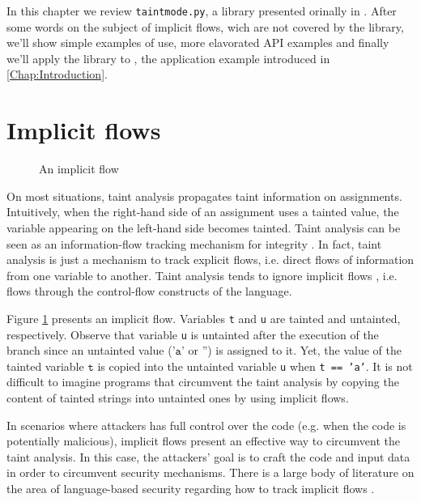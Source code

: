 In this chapter we review \texttt{taintmode.py}, a library
presented orinally in \cite{PythonLib}. After some words on the 
subject of implicit flows, wich are not covered by the library,
we'll show simple examples of use, more elavorated API examples
and finally we'll apply the library to \suggestions, the application
example introduced in \ref{Chap:Introduction}.

\section*{Implicit flows}

\begin{figure}[t]
{\small{
\begin{minipage}[t]{0.5\linewidth}
 
\end{minipage}
\caption{\label{fig:implicit}An implicit flow}
}}
\end{figure}

On most situations, taint analysis \cite{Perl,Ruby} 
propagates taint information on assignments.  
Intuitively, when the right-hand side of an assignment uses a tainted value, 
the variable appearing on the left-hand side becomes tainted.
Taint analysis can be seen as an information-flow tracking 
mechanism for integrity \cite{Sabelfeld:Myers:JSAC}. 
In fact, taint analysis is just a mechanism to 
track explicit flows, i.e. direct flows of information 
from one variable to another. 
Taint analysis tends to ignore 
implicit flows \cite{Denning:Denning:Certification}, i.e. 
flows through the control-flow constructs of the language. 

Figure \ref{fig:implicit} presents an implicit 
flow. Variables \texttt{t} and \texttt{u} are 
tainted and untainted, respectively.
Observe that variable \texttt{u} 
is untainted after the execution of the branch since 
an untainted value ($\texttt{'a'}$ or
$\texttt{''}$) is assigned to it. Yet, the value of the tainted variable 
$\texttt{t}$ is copied into the untainted variable 
\texttt{u} when \texttt{t == 'a'}. 
It is not difficult to imagine 
programs that circumvent the taint analysis by
copying the content of tainted strings 
into untainted ones by using implicit flows\cite{Russo:IOS}.

In scenarios where attackers has full control over the code 
(e.g. when the code is potentially malicious), implicit flows present
an effective way to circumvent the taint
analysis. In this case, the attackers' goal  is to craft the code and input 
data in order to circumvent security mechanisms. There is a large body
of literature on the area of language-based security regarding 
how to track implicit flows \cite{Sabelfeld:Myers:JSAC}. 


